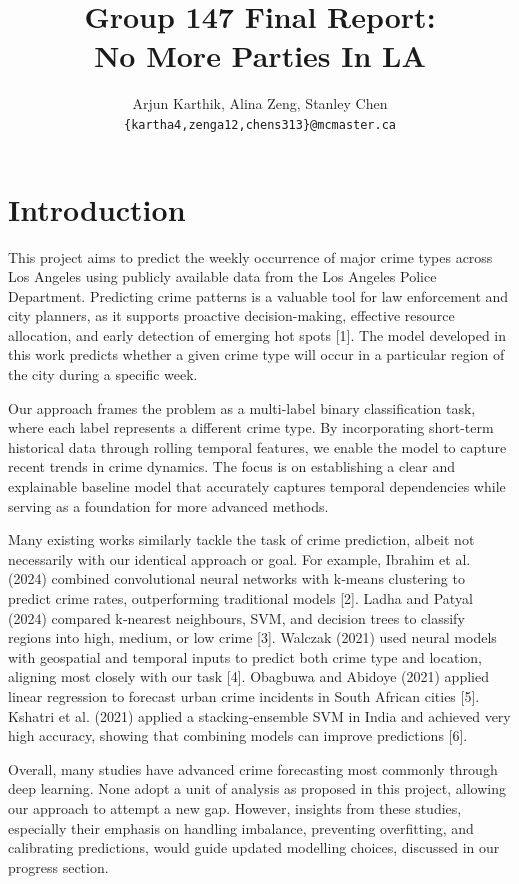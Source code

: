 \documentclass[11pt]{article}
\title{Group 147 Final Report:\\No More Parties In LA}
\author{Arjun Karthik, Alina Zeng, Stanley Chen \\
  \texttt{\{kartha4,zenga12,chens313\}@mcmaster.ca} }
\begin{document}
\maketitle


\section{Introduction}

This project aims to predict the weekly occurrence of major crime types across Los Angeles using publicly available data from the Los Angeles Police Department. Predicting crime patterns is a valuable tool for law enforcement and city planners, as it supports proactive decision-making, effective resource allocation, and early detection of emerging hot spots [1]. The model developed in this work predicts whether a given crime type will occur in a particular region of the city during a specific week.

Our approach frames the problem as a multi-label binary classification task, where each label represents a different crime type. By incorporating short-term historical data through rolling temporal features, we enable the model to capture recent trends in crime dynamics. The focus is on establishing a clear and explainable baseline model that accurately captures temporal dependencies while serving as a foundation for more advanced methods.

Many existing works similarly tackle the task of crime prediction, albeit not necessarily with our identical approach or goal. For example, Ibrahim et al. (2024) combined convolutional neural networks with k‑means clustering to predict crime rates, outperforming traditional models [2]. Ladha and Patyal (2024) compared k‑nearest neighbours, SVM, and decision trees to classify regions into high, medium, or low crime [3]. Walczak (2021) used neural models with geospatial and temporal inputs to predict both crime type and location, aligning most closely with our task [4]. Obagbuwa and Abidoye (2021) applied linear regression to forecast urban crime incidents in South African cities [5]. Kshatri et al. (2021) applied a stacking‑ensemble SVM in India and achieved very high accuracy, showing that combining models can improve predictions [6].

Overall, many studies have advanced crime forecasting most commonly through deep learning. None adopt a unit of analysis as proposed in this project, allowing our approach to attempt a new gap. However, insights from these studies, especially their emphasis on handling imbalance, preventing overfitting, and calibrating predictions, would guide updated modelling choices, discussed in our progress section.
\end{document}
